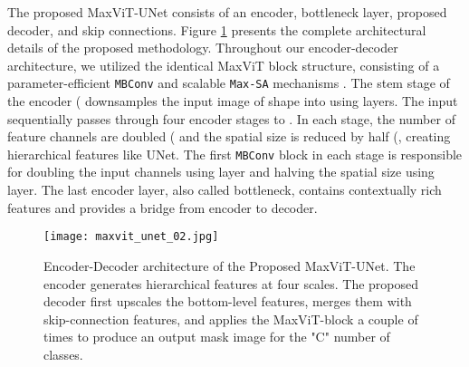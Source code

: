 \documentclass{article}
\begin{document}
The proposed MaxViT-UNet consists of an encoder, bottleneck layer, proposed decoder, and skip connections. Figure \ref{fig:maxvit-unet-architecture} presents the complete architectural details of the proposed methodology. Throughout our encoder-decoder architecture, we utilized the identical MaxViT block structure, consisting of a parameter-efficient \texttt{MBConv} \cite{sandler2018mobilenetv2} and scalable \texttt{Max-SA} mechanisms \cite{tu2022maxvit}. The stem stage of the encoder ( downsamples the input image of shape  into  using  layers. The input sequentially passes through four encoder stages  to . In each stage, the number of feature channels are doubled ( and the spatial size is reduced by half (, creating hierarchical features like UNet. The first \texttt{MBConv} block in each stage is responsible for doubling the input channels using  layer and halving the spatial size using  layer. The last encoder layer, also called bottleneck, contains contextually rich features and provides a bridge from encoder to decoder.

\begin{figure}[ht!]
  \centering
  \texttt{[image: maxvit\_unet\_02.jpg]}
  \caption{Encoder-Decoder architecture of the Proposed MaxViT-UNet. The encoder generates hierarchical features at four scales. The proposed decoder first upscales the bottom-level features, merges them with skip-connection features, and applies the MaxViT-block a couple of times to produce an output mask image for the "C" number of classes.}
  \label{fig:maxvit-unet-architecture}
\end{figure}
\end{document}
